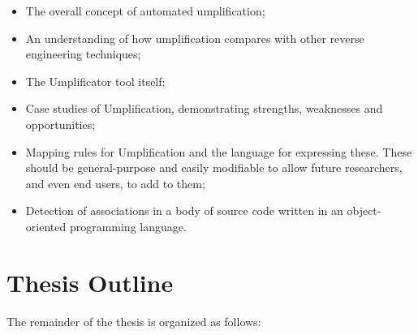 \begin{itemize}
\item The overall concept of automated umplification;

\item An understanding of how umplification compares with other reverse engineering techniques;

\item The Umplificator tool itself;

\item Case studies of Umplification, demonstrating strengths, weaknesses and opportunities;

\item Mapping rules for Umplification and the language for expressing these. These should be general-purpose and easily modifiable to allow future researchers, and even end users, to add to them;

\item Detection of associations in a body of source code written in an object-oriented programming language. 
\end{itemize}

\section{Thesis Outline}

The remainder of the thesis is organized as follows:

